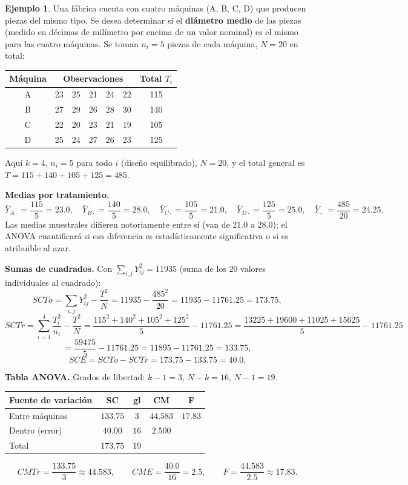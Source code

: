 \documentclass[11pt,a4paper]{article}
\theoremstyle{plain}
\theoremstyle{definition}
\newtheorem{ejemplo}[teorema]{Ejemplo}
\theoremstyle{remark}
\begin{document}
\begin{ejemplo}
Una fábrica cuenta con cuatro máquinas (A, B, C, D) que producen piezas del mismo tipo. Se desea determinar si el \textbf{diámetro medio} de las piezas (medido en décimas de milímetro por encima de un valor nominal) es el mismo para las cuatro máquinas. Se toman $n_i=5$ piezas de cada máquina, $N=20$ en total:

\begin{center}
\begin{tabular}{c|ccccc|c}
\toprule
Máquina & \multicolumn{5}{c|}{Observaciones} & Total $T_i$ \\
\midrule
A & 23 & 25 & 21 & 24 & 22 & 115 \\
B & 27 & 29 & 26 & 28 & 30 & 140 \\
C & 22 & 20 & 23 & 21 & 19 & 105 \\
D & 25 & 24 & 27 & 26 & 23 & 125 \\
\bottomrule
\end{tabular}
\end{center}

Aquí $k=4$, $n_i=5$ para todo $i$ (diseño equilibrado), $N=20$, y el total general es $T=115+140+105+125=485$.

\medskip
\noindent\textbf{Medias por tratamiento.}
\[
\bar Y_{A\cdot}=\frac{115}{5}=23.0, \quad \bar Y_{B\cdot}=\frac{140}{5}=28.0, \quad \bar Y_{C\cdot}=\frac{105}{5}=21.0, \quad \bar Y_{D\cdot}=\frac{125}{5}=25.0, \quad \bar Y_{\cdot\cdot}=\frac{485}{20}=24.25.
\]
Las medias muestrales difieren notoriamente entre sí (van de $21.0$ a $28.0$); el ANOVA cuantificará si esa diferencia es estadísticamente significativa o si es atribuible al azar.

\medskip
\noindent\textbf{Sumas de cuadrados.} Con $\sum_{i,j}Y_{ij}^2=11935$ (suma de los 20 valores individuales al cuadrado):
\[
SCTo = \sum_{i,j}Y_{ij}^2 - \frac{T^2}{N} = 11935-\frac{485^2}{20} = 11935-11761.25 = 173.75,
\]
\[
SCTr = \sum_{i=1}^4\frac{T_i^2}{n_i} - \frac{T^2}{N} = \frac{115^2+140^2+105^2+125^2}{5} - 11761.25 = \frac{13225+19600+11025+15625}{5}-11761.25
\]
\[
= \frac{59475}{5}-11761.25 = 11895-11761.25 = 133.75,
\]
\[
SCE = SCTo-SCTr = 173.75-133.75 = 40.0.
\]

\medskip
\noindent\textbf{Tabla ANOVA.} Grados de libertad: $k-1=3$, $N-k=16$, $N-1=19$.

\begin{center}
\begin{tabular}{lcccc}
\toprule
Fuente de variación & SC & gl & CM & F \\
\midrule
Entre máquinas & $133.75$ & $3$ & $44.583$ & $17.83$ \\
Dentro (error) & $40.00$ & $16$ & $2.500$ & \\
\midrule
Total & $173.75$ & $19$ & & \\
\bottomrule
\end{tabular}
\end{center}
\[
CMTr = \frac{133.75}{3} \approx 44.583, \qquad CME = \frac{40.0}{16} = 2.5, \qquad F = \frac{44.583}{2.5} \approx 17.83.
\]


\end{ejemplo}
\end{document}
